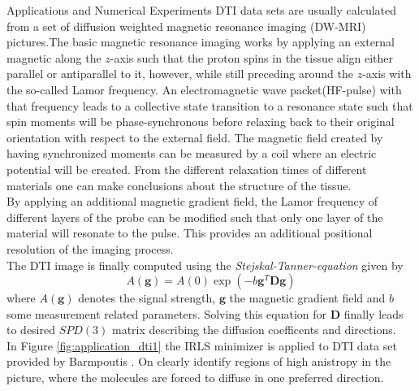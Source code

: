 \begin{chapter}{Applications and Numerical Experiments}
DTI data sets are usually calculated from a set of diffusion weighted magnetic resonance imaging (DW-MRI) pictures.The basic magnetic resonance imaging works by applying an external magnetic along
the $z$-axis such that the proton spins in the tissue align either parallel or antiparallel to it, however, while still preceding around the $z$-axis with the so-called Lamor frequency.
An electromagnetic wave packet(HF-pulse) with that frequency leads to a collective state transition to a resonance state such that spin moments will be phase-synchronous before relaxing
back to their original orientation with respect to the external field. The magnetic field created by having synchronized moments can be measured by a coil where an electric potential will be created.
From the different relaxation times of different materials one can make conclusions about the structure of the tissue.\\
By applying an additional magnetic gradient field, the Lamor frequency of different layers of the probe can be modified such that only one layer of the material will resonate to the pulse.
This provides an additional positional resolution of the imaging process.\\

The DTI image is finally computed using the \emph{Stejskal-Tanner-equation} given by
\begin{equation}
    A(\mathbf{g})=A(0)\exp(-b\mathbf{g}^T\mathbf{D}\mathbf{g})
\end{equation}
where $A(\mathbf{g})$ denotes the signal strength, $\mathbf{g}$ the magnetic gradient field and $b$ some measurement related parameters. Solving this equation for $\mathbf{D}$ finally
leads to desired $SPD(3)$ matrix describing the diffusion coefficents and directions.\\

In Figure \ref{fig:application_dti1} the IRLS minimizer is applied to DTI data set provided by Barmpoutis \cite{barmpoutis}.
On clearly identify regions of high anistropy in the picture, where the molecules are forced to diffuse in one preferred direction.


\end{chapter}
